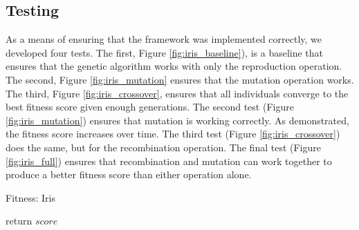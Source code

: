 \documentclass[12pt, final]{dalcsthesis}
\begin{document}
\subsection{Testing}
As a means of ensuring that the framework was implemented correctly, we developed four tests.
The first, Figure \ref{fig:iris_baseline}), is a baseline that ensures that the genetic algorithm works with only the reproduction operation. The second,
Figure \ref{fig:iris_mutation} ensures that the mutation operation works. The third, Figure \ref{fig:iris_crossover}, ensures that
all individuals converge to the best fitness score given enough generations. The second test (Figure \ref{fig:iris_mutation})
ensures that mutation is working correctly. As demonstrated, the fitness score increases over time. The third test (Figure \ref{fig:iris_crossover})
does the same, but for the recombination operation. The final test (Figure \ref{fig:iris_full}) ensures that recombination and mutation can work together to produce a better fitness score than either operation alone.

\begin{algorithm}[hb]
	\caption{Fitness: Iris}
	\label{alg:fitness-iris}
	\begin{algorithmic}[1]
		\EndIf
		\EndFor
		\EndFor
		\State return $score$
	\end{algorithmic}
\end{algorithm}
\end{document}
